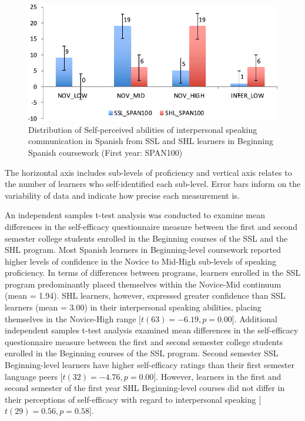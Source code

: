 \documentclass[output=paper]{langscibook}
\begin{document}
\begin{figure}
\caption{Distribution of Self-perceived abilities of interpersonal speaking communication in Spanish from SSL and SHL learners in Beginning Spanish coursework (First year: SPAN100)}
\label{fig:3:1}
\includegraphics[width=\textwidth]{figures/Figure1-Chapter3.pdf}
\end{figure}

The horizontal axis includes sub-levels of proficiency and vertical axis relates to the number of learners who self-identified each sub-level. Error bars inform on the variability of data and indicate how precise each measurement is.

An independent samples t-test analysis was conducted to examine mean differences in the self-efficacy questionnaire measure between the first and second semester college students enrolled in the Beginning courses of the SSL and the SHL program. Most Spanish learners in Beginning-level coursework reported higher levels of confidence in the Novice to Mid-High sub-levels of speaking proficiency. In terms of differences between programs, learners enrolled in the SSL program predominantly placed themselves within the Novice-Mid continuum (mean = 1.94). SHL learners, however, expressed greater confidence than SSL learners (mean = 3.00) in their interpersonal speaking abilities, placing themselves in the Novice-High range [$t(63) = -6.19, p = 0.00$].  Additional in\-de\-pen\-dent samples t-test analysis examined mean differences in the self-efficacy questionnaire measure between the first and second semester college students enrolled in the Beginning courses of the SSL program. Second semester SSL Beginning-level learners have higher self-efficacy ratings than their first se\-mes\-ter language peers [$t(32) = -4.76,\allowbreak p = 0.00$]. However, learners in the first and second semester of the first year SHL Beginning-level courses did not differ in their perceptions of self-efficacy with regard to interpersonal speaking [$t(29) = 0.56,\allowbreak p = 0.58$].
\end{document}

